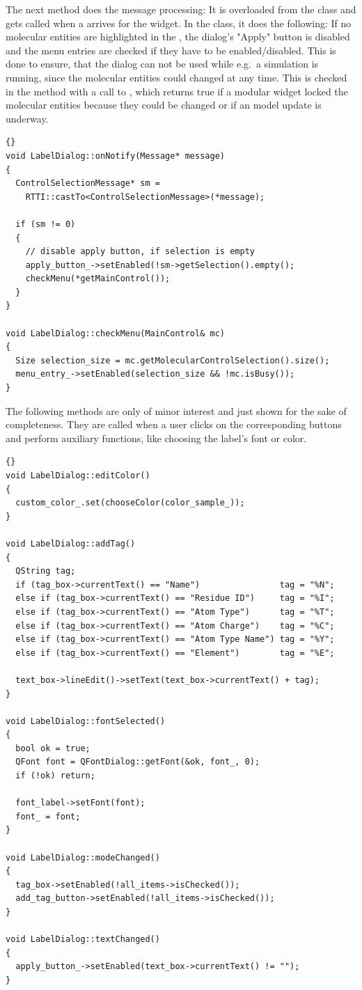 \vspace{-0.2cm}
The next method  does the message processing:\label{onNotify}
It is overloaded from the  class and gets called when a  
arrives for the widget. In the  class, it does the following:
If no molecular entities are highlighted in the , the dialog's 
"Apply" button is disabled and the menu entries are checked if they have to be 
enabled/disabled. 
This is done to ensure, that the dialog can not be used while e.g.\ a simulation is 
running, since the molecular entities could changed at any time. 
This is checked in the  method with a call to , 
which returns true if a modular widget locked the molecular entities because they could 
be changed or if an model update is underway.
\begin{lstlisting}{}
void LabelDialog::onNotify(Message* message)
{
  ControlSelectionMessage* sm = 
    RTTI::castTo<ControlSelectionMessage>(*message);

  if (sm != 0)
  {
    // disable apply button, if selection is empty
    apply_button_->setEnabled(!sm->getSelection().empty();
    checkMenu(*getMainControl());
  }
}

void LabelDialog::checkMenu(MainControl& mc)
{
  Size selection_size = mc.getMolecularControlSelection().size();
  menu_entry_->setEnabled(selection_size && !mc.isBusy());
}
\end{lstlisting}

The following methods are only of minor interest and just shown for the sake of completeness.
They are called when a user clicks on the
corresponding buttons and perform auxiliary functions, like choosing the label's 
font or color.
\begin{lstlisting}{}
void LabelDialog::editColor()
{
  custom_color_.set(chooseColor(color_sample_));
}

void LabelDialog::addTag()
{
  QString tag;
  if (tag_box->currentText() == "Name")                tag = "%N";
  else if (tag_box->currentText() == "Residue ID")     tag = "%I";
  else if (tag_box->currentText() == "Atom Type")      tag = "%T";
  else if (tag_box->currentText() == "Atom Charge")    tag = "%C";
  else if (tag_box->currentText() == "Atom Type Name") tag = "%Y";
  else if (tag_box->currentText() == "Element")        tag = "%E";

  text_box->lineEdit()->setText(text_box->currentText() + tag);
}

void LabelDialog::fontSelected()
{
  bool ok = true;
  QFont font = QFontDialog::getFont(&ok, font_, 0);
  if (!ok) return;

  font_label->setFont(font);
  font_ = font;
}

void LabelDialog::modeChanged()
{
  tag_box->setEnabled(!all_items->isChecked());
  add_tag_button->setEnabled(!all_items->isChecked());
}

void LabelDialog::textChanged()
{
  apply_button_->setEnabled(text_box->currentText() != "");
}
\end{lstlisting}

